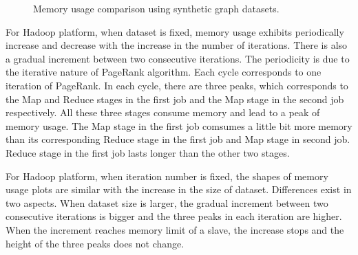 \documentclass[10pt,conference,compsocconf]{IEEEtran}
\begin{document}
\begin{figure}[!t]
  \centering
  \caption{Memory usage comparison using synthetic graph datasets.}
  \label{fig:time_memory_syn} 
\end{figure}

For Hadoop platform, when dataset is fixed, memory usage exhibits periodically increase and decrease with the increase in the number of iterations. There is also a gradual increment between two consecutive iterations. The periodicity is due to the iterative nature of PageRank algorithm. Each cycle corresponds to one iteration of PageRank. In each cycle, there are three peaks, which corresponds to the Map and Reduce stages in the first job and the Map stage in the second job respectively. All these three stages consume memory and lead to a peak of memory usage. The Map stage in the first job comsumes a little bit more memory than its corresponding Reduce stage in the first job and Map stage in second job. Reduce stage in the first job lasts longer than the other two stages. 

For Hadoop platform, when iteration number is fixed, the shapes of memory usage plots are similar with the increase in the size of dataset. Differences exist in two aspects. When dataset size is larger, the gradual increment between two consecutive iterations is bigger and the three peaks in each iteration are higher. When the increment reaches memory limit of a slave, the increase stops and the height of the three peaks does not change.
\end{document}
